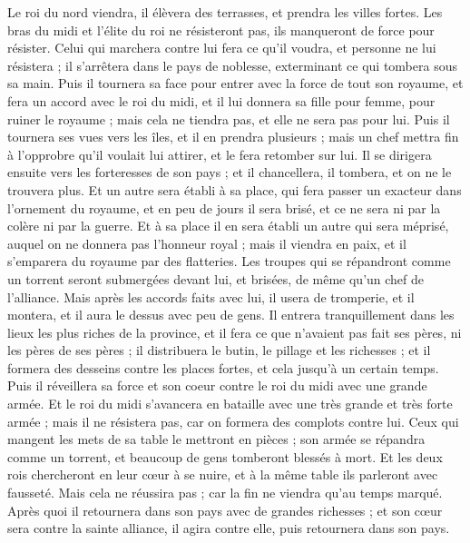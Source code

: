 \begin{multicols}{2}
Le roi du nord viendra, il élèvera des terrasses, et prendra les villes fortes. Les bras du midi et l'élite du roi ne résisteront pas, ils manqueront de force pour résister.
Celui qui marchera contre lui fera ce qu'il voudra, et personne ne lui résistera ; il s'arrêtera dans le pays de noblesse, exterminant ce qui tombera sous sa main.
Puis il tournera sa face pour entrer avec la force de tout son royaume, et fera un accord avec le roi du midi, et il lui donnera sa fille pour femme, pour ruiner le royaume ; mais cela ne tiendra pas, et elle ne sera pas pour lui. 
Puis il tournera ses vues vers les îles, et il en prendra plusieurs ; mais un chef mettra fin à l'opprobre qu'il voulait lui attirer, et le fera retomber sur lui.
Il se dirigera ensuite vers les forteresses de son pays ; et il chancellera, il tombera, et on ne le trouvera plus.
Et un autre sera établi à sa place, qui fera passer un exacteur dans l'ornement du royaume, et en peu de jours il sera brisé, et ce ne sera ni par la colère ni par la guerre.
Et à sa place il en sera établi un autre qui sera méprisé, auquel on ne donnera pas l'honneur royal ; mais il viendra en paix, et il s'emparera du royaume par des flatteries.
Les troupes qui se répandront comme un torrent seront submergées devant lui, et brisées, de même qu'un chef de l'alliance.
Mais après les accords faits avec lui, il usera de tromperie, et il montera, et il aura le dessus avec peu de gens.
 Il entrera tranquillement dans les lieux les plus riches de la province, et il fera ce que n'avaient pas fait ses pères, ni les pères de ses pères ; il distribuera le butin, le pillage et les richesses ; et il formera des desseins contre les places fortes, et cela jusqu'à un certain temps.
Puis il réveillera sa force et son coeur contre le roi du midi avec une grande armée. Et le roi du midi s'avancera en bataille avec une très grande et très forte armée ; mais il ne résistera pas, car on formera des complots contre lui.
Ceux qui mangent les mets de sa table le mettront en pièces ; son armée se répandra comme un torrent, et beaucoup de gens tomberont blessés à mort.
Et les deux rois chercheront en leur cœur à se nuire, et à la même table ils parleront avec fausseté. Mais cela ne réussira pas ; car la fin ne viendra qu'au temps marqué.
Après quoi il retournera dans son pays avec de grandes richesses ; et son cœur sera contre la sainte alliance, il agira contre elle, puis retournera dans son pays.

\end{multicols}
